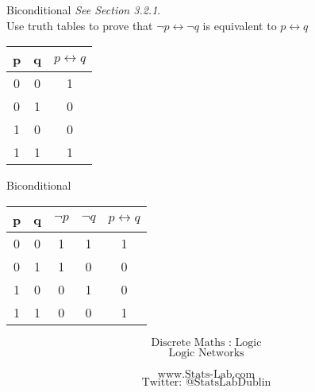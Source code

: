 \documentclass{beamer}
\begin{document}
\begin{frame}
{Biconditional}
\emph{See Section 3.2.1}.\\

Use truth tables to prove that $ \neg p \leftrightarrow \neg q $ is equivalent to  $ p \leftrightarrow q $
\begin{center}
\begin{tabular}{|c|c|c|}
\hline  p& q & $p \leftrightarrow q$ \\ 
\hline  0& 0 &  1\\ 
\hline  0& 1 &  0\\ 
\hline  1& 0 &  0\\ 
\hline  1& 1 &  1\\ 
\hline 
\end{tabular}
\end{center} 
\end{frame}
\begin{frame}
{Biconditional}

\begin{tabular}{|c|c|c|c|c|}
\hline  \phantom{sp} p \phantom{sp} & \phantom{sp} q \phantom{sp} & $\neg p$ & $\neg q$ & $p \leftrightarrow q$ \\ 
\hline  0& 0 & 1& 1 & 1\\ 
\hline  0& 1 &  1& 0& 0\\ 
\hline  1& 0 &  0& 1& 0\\ 
\hline  1& 1 &  0 & 0& 1\\ 
\hline 
\end{tabular} 
\end{frame}
\begin{frame}
\Huge
\[\mbox{Discrete Maths :  Logic}\]
\[\mbox{Logic Networks}\]
\bigskip

\[\mbox{www.Stats-Lab.com}\]
\[\mbox{Twitter: @StatsLabDublin}\]
\end{frame}
\end{document}
